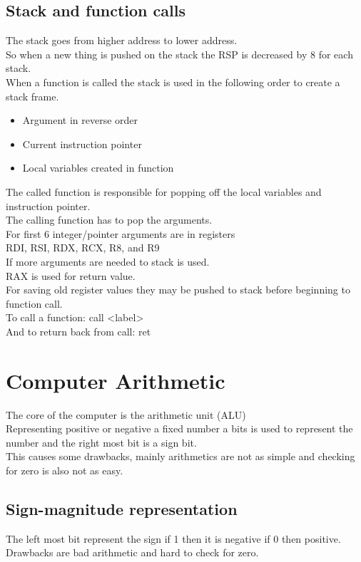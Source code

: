 \documentclass[12pt, a4paper]{article}
\begin{document}
		\subsection{Stack and function calls}
			The stack goes from higher address to lower address.\\
			So when a new thing is pushed on the stack the RSP is decreased by 8 for each stack.\\
			When a function is called the stack is used in the following order to create a stack frame.
			\begin{itemize}
				\item Argument in reverse order
				\item Current instruction pointer 
				\item Local variables created in function
			\end{itemize}
			The called function is responsible for popping off the local variables and instruction pointer.\\
			The calling function has to pop the arguments.\\
			For first 6 integer/pointer arguments are in registers\\
			RDI, RSI, RDX, RCX, R8, and R9\\
			If more arguments are needed to stack is used.\\
			RAX is used for return value.\\
			For saving old register values they may be pushed to stack before beginning to function call.\\
			To call a function: call <label>\\
			And to return back from call: ret
	\section{Computer Arithmetic}
		The core of the computer is the arithmetic unit (ALU)\\
		Representing positive or negative a fixed number a bits is used to represent the number and the right most bit is a sign bit.\\
		This causes some drawbacks, mainly arithmetics are not as simple and checking for zero is also not as easy.\\
		\subsection{Sign-magnitude representation}
			The left most bit represent the sign if 1 then it is negative if 0 then positive.\\
			Drawbacks are bad arithmetic and hard to check for zero.
\end{document}
